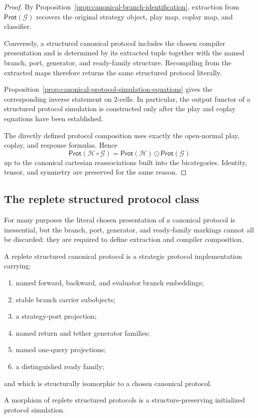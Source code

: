 \begin{proof}
By Proposition~\ref{prop:canonical-branch-identification}, extraction from
\(\mathsf{Prot}(\mathcal G)\) recovers the original strategy object, play map, coplay map, and
classifier.

Conversely, a structured canonical protocol includes the chosen compiler presentation and is
determined by its extracted tuple together with the named branch, port, generator, and ready-family
structure. Recompiling from the extracted maps therefore returns the same structured protocol
literally.

Proposition~\ref{prop:canonical-protocol-simulation-equations} gives the corresponding inverse
statement on \(2\)-cells. In particular, the output functor of a structured protocol simulation is
constructed only after the play and coplay equations have been established.

The directly defined protocol composition uses exactly the open-normal play, coplay, and response
formulas. Hence
\[
  \mathsf{Prot}(\mathcal H\circ\mathcal G)
  =
  \mathsf{Prot}(\mathcal H)
  \odot
  \mathsf{Prot}(\mathcal G)
\]
up to the canonical cartesian reassociations built into the bicategories. Identity, tensor, and
symmetry are preserved for the same reason.
\end{proof}

\subsection{The replete structured protocol class}

For many purposes the literal chosen presentation of a canonical protocol is inessential, but the
branch, port, generator, and ready-family markings cannot all be discarded: they are required to
define extraction and compiler composition.

\begin{definition}
\label{def:replete-structured-canonical-protocol}
A replete structured canonical protocol is a strategic protocol implementation carrying:
\begin{enumerate}
  \item named forward, backward, and evaluator branch embeddings;
  \item stable branch carrier subobjects;
  \item a strategy-port projection;
  \item named return and tether generator families;
  \item named one-query projections;
  \item a distinguished ready family;
\end{enumerate}
and which is structurally isomorphic to a chosen canonical protocol.

A morphism of replete structured protocols is a structure-preserving initialized protocol
simulation.
\end{definition}

